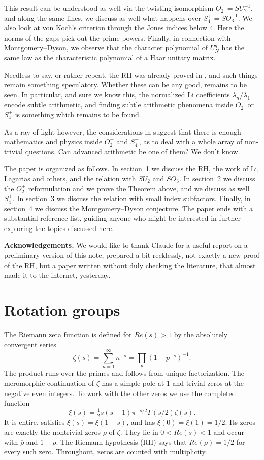 \documentclass[11pt,a4paper]{article}
\begin{document}
This result can be understood as well via the twisting isomorphism $O_2^+=SU_2^{-1}$, and along the same lines, we discuss as well what happens over $S_4^+=SO_3^{-1}$. We also look at von Koch's criterion through the Jones indices below $4$. Here the norms of the gaps pick out the prime powers. Finally, in connection with Montgomery--Dyson, we observe that the character polynomial of $U_N^q$ has the same law as the characteristic polynomial of a Haar unitary matrix.

Needless to say, or rather repeat, the RH was already proved in \cite{alpoge-claude}, and such things remain something speculatory. Whether these can be any good, remains to be seen. In particular, and sure we know this, the normalized Li coefficients $\lambda_n/\lambda_1$ encode subtle arithmetic, and finding subtle arithmetic phenomena inside $O_2^+$ or $S_4^+$ is something which remains to be found.

As a ray of light however, the considerations in \cite{banica-opus} suggest that there is enough mathematics and physics inside $O_2^+$ and $S_4^+$, as to deal with a whole array of non-trivial questions. Can advanced arithmetic be one of them? We don't know.

The paper is organized as follows. In section~1 we discuss the RH, the work of Li, Lagarias and others, and the relation with $SU_2$ and $SO_3$. In section~2 we discuss the $O_2^+$ reformulation and we prove the Theorem above, and we discuss as well $S_4^+$. In section~3 we discuss the relation with small index subfactors. Finally, in section~4 we discuss the Montgomery--Dyson conjecture. The paper ends with a substantial reference list, guiding anyone who might be interested in further exploring the topics discussed here.

\medskip
\noindent\textbf{Acknowledgements.} We would like to thank Claude for a useful report on a preliminary version of this note, prepared a bit recklessly, not exactly a new proof of the RH, but a paper written without duly checking the literature, that almost made it to the internet, yesterday.

\section{Rotation groups}\label{rh}
The Riemann zeta function is defined for $Re(s)>1$ by the absolutely convergent series
\[
 \zeta(s)=\sum_{n=1}^\infty n^{-s}=\prod_p(1-p^{-s})^{-1}.
\]
The product runs over the primes and follows from unique factorization. The meromorphic continuation of $\zeta$ has a simple pole at $1$ and trivial zeros at the negative even integers. To work with the other zeros we use the completed function
\[
 \xi(s)=\tfrac12 s(s-1)\pi^{-s/2}\Gamma(s/2)\zeta(s).
\]
It is entire, satisfies $\xi(s)=\xi(1-s)$, and has $\xi(0)=\xi(1)=1/2$. Its zeros are exactly the nontrivial zeros $\rho$ of $\zeta$. They lie in $0<Re(s)<1$ and occur with $\overline\rho$ and $1-\rho$. The Riemann hypothesis (RH) says that $Re(\rho)=1/2$ for every such zero. Throughout, zeros are counted with multiplicity.
\end{document}
